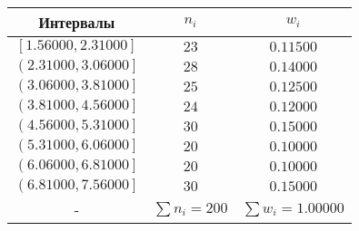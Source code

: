 %
\normalsize%
\begin{longtabu}spread 0pt{ | c | c | c | }%
\hline%
Интервалы&$n_i$&$w_i$\\%
\hline%
$\left[1.56000,2.31000\right]$&$23$&$0.11500$\\%
\hline%
$\left(2.31000,3.06000\right]$&$28$&$0.14000$\\%
\hline%
$\left(3.06000,3.81000\right]$&$25$&$0.12500$\\%
\hline%
$\left(3.81000,4.56000\right]$&$24$&$0.12000$\\%
\hline%
$\left(4.56000,5.31000\right]$&$30$&$0.15000$\\%
\hline%
$\left(5.31000,6.06000\right]$&$20$&$0.10000$\\%
\hline%
$\left(6.06000,6.81000\right]$&$20$&$0.10000$\\%
\hline%
$\left(6.81000,7.56000\right]$&$30$&$0.15000$\\%
\hline%
{-}&$\sum\limits n_i = 200$&$\sum\limits w_i = 1.00000$\\%
\hline%
\end{longtabu}%
%